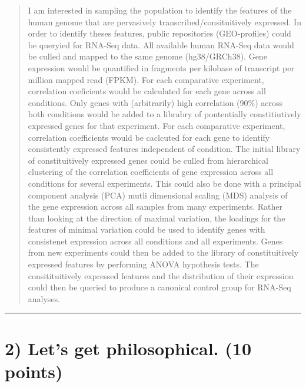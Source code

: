 \documentclass[]{article}
\begin{document}
\begin{quote}
I am interested in sampling the population to identify the features of
the human genome that are pervasively transcribed/consituitively
expressed. In order to identify theses features, public repositories
(GEO-profiles) could be queryied for RNA-Seq data. All available human
RNA-Seq data would be culled and mapped to the same genome
(hg38/GRCh38). Gene expression would be quantified in fragments per
kilobase of transcript per million mapped read (FPKM). For each
comparative experiment, correlation coeficients would be calculated for
each gene across all conditions. Only genes with (arbitrarily) high
correlation (90\%) across both conditions would be added to a librabry
of pontentially constitiutively expressed genes for that experiment. For
each comparative experiment, correlation coefficients would be caclcuted
for each gene to identify consistently expressed features independent of
condition. The initial library of constituitively expressed genes could
be culled from hierarchical clustering of the correlation coefficients
of gene expression across all conditions for several experiments. This
could also be done with a principal component analysis (PCA) mutli
dimensional scaling (MDS) analysis of the gene expression across all
samples from many experiments. Rather than looking at the direction of
maximal variation, the loadings for the features of minimal variation
could be used to identify genes with consistenet expression across all
conditions and all experiments. Genes from new experiments could then be
added to the library of constituitively expressed features by performing
ANOVA hypothesis tests. The consitituitively expressed features and the
distribution of their expression could then be queried to produce a
canonical control group for RNA-Seq analyses.
\end{quote}

\begin{center}\rule{0.5\linewidth}{\linethickness}\end{center}

\section{2) Let's get philosophical. (10
points)}\label{lets-get-philosophical.-10-points}
\end{document}
